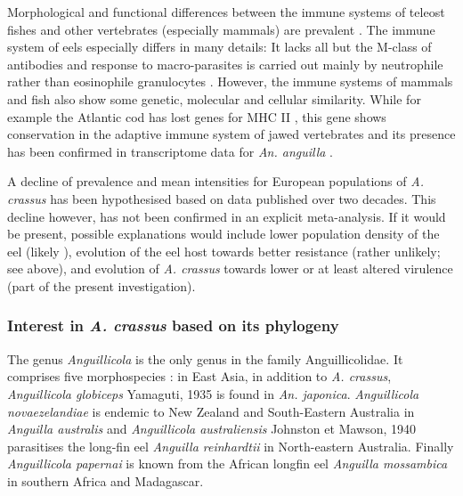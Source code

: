 Morphological and functional differences between the immune systems of
teleost fishes and other vertebrates (especially mammals) are
prevalent \cite{press1999morphology}. The immune system of eels
especially differs in many details: It lacks all but the M-class of
antibodies and response to macro-parasites is carried out mainly by
neutrophile rather than eosinophile granulocytes
\cite{nielsen_eel_2006}. However, the immune systems of mammals and
fish also show some genetic, molecular and cellular similarity. While
for example the Atlantic cod has lost genes for MHC II
\cite{pmid21832995}, this gene shows conservation in the adaptive
immune system of jawed vertebrates \cite{pmid21078341} and its
presence has been confirmed in transcriptome data for
\textit{An. anguilla} \cite{pmid17666525}.

A decline of prevalence and mean intensities for European populations
of \textit{A. crassus} has been hypothesised based on data published
over two decades. This decline however, has not been confirmed in an
explicit meta-analysis. If it would be present, possible explanations
would include lower population density of the eel (likely
\cite{schabuss_dynamics_2005}), evolution of the eel host towards
better resistance (rather unlikely; see above), and evolution of
\textit{A. crassus} towards lower or at least altered virulence (part
of the present investigation).

\subsubsection{Interest in \textit{A. crassus} based on its
    phylogeny}
\label{phyl-int}

The genus \textit{Anguillicola} is the only genus in the family
Anguillicolidae. It comprises five morphospecies
\cite{taraschewski_revision_1988}: in East Asia, in addition to
\textit{A. crassus}, \textit{Anguillicola globiceps} Yamaguti, 1935
\cite{yamaguti_globiceps} is found in \textit{An.
  japonica}. \textit{Anguillicola novaezelandiae} is endemic to New
Zealand and South-Eastern Australia in \textit{Anguilla australis} and
\textit{Anguillicola australiensis} Johnston et Mawson, 1940
\cite{johnston1940some} parasitises the long-fin eel \textit{Anguilla
  reinhardtii} in North-eastern Australia. Finally
\textit{Anguillicola papernai} is known from the African longfin eel
\textit{Anguilla mossambica} in southern Africa and Madagascar.


